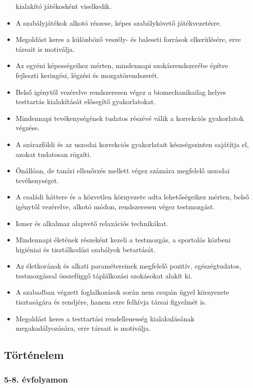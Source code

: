 \begin{itemize}
  kialakító játékosként viselkedik.
\item
  A szabályjátékok alkotó részese, képes szabálykövető játékvezetésre.
\item
  Megoldást keres a különböző veszély- és baleseti források
  elkerülésére, erre társait is motiválja.
\item
  Az egyéni képességeihez mérten, mindennapi szokásrendszerébe építve
  fejleszti keringési, légzési és mozgatórendszerét.
\item
  Belső igénytől vezérelve rendszeresen végez a biomechanikailag helyes
  testtartás kialakítását elősegítő gyakorlatokat.
\item
  Mindennapi tevékenységének tudatos részévé válik a korrekciós
  gyakorlatok végzése.
\item
  A szárazföldi és az uszodai korrekciós gyakorlatait készségszinten
  sajátítja el, azokat tudatosan rögzíti.
\item
  Önállóan, de tanári ellenőrzés mellett végez számára megfelelő uszodai
  tevékenységet.
\item
  A családi háttere és a közvetlen környezete adta lehetőségeihez
  mérten, belső igénytől vezérelve, alkotó módon, rendszeresen végez
  testmozgást.
\item
  Ismer és alkalmaz alapvető relaxációs technikákat.
\item
  Mindennapi életének részeként kezeli a testmozgás, a sportolás közbeni
  higiéniai és tisztálkodási szabályok betartását.
\item
  Az életkorának és alkati paramétereinek megfelelő pozitív,
  egészégtudatos, testmozgással összefüggő táplálkozási szokásokat
  alakít ki.
\item
  A szabadban végzett foglalkozások során nem csupán ügyel környezete
  tisztaságára és rendjére, hanem erre felhívja társai figyelmét is.
\item
  Megoldást keres a testtartási rendellenesség kialakulásának
  megakadályozására, erre társait is motiválja.
\end{itemize}

\hypertarget{tortenelem}{%
\subsection{Történelem}\label{tortenelem}}

\hypertarget{evfolyamon-36}{%
\subsubsection{5-8. évfolyamon}\label{evfolyamon-36}}


